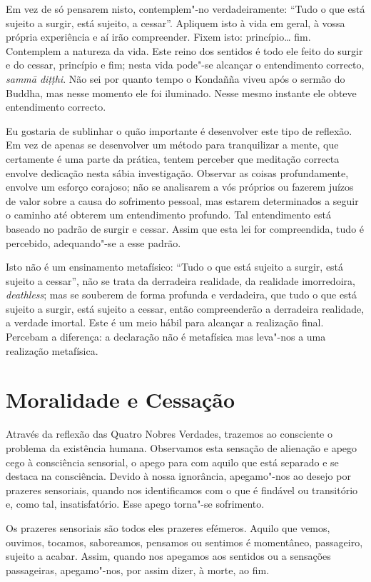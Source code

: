 Em vez de só pensarem nisto, contemplem"-no verdadeiramente: “Tudo o que está
sujeito a surgir, está sujeito, a cessar”. Apliquem isto à vida em geral, à
vossa própria experiência e aí irão compreender. Fixem isto: princípio\ldots{}
fim. Contemplem a natureza da vida. Este reino dos sentidos é todo ele feito do
surgir e do cessar, princípio e fim; nesta vida pode"-se alcançar o entendimento
correcto, \emph{sammā diṭṭhi}. Não sei por quanto tempo o Kondañña viveu após o
sermão do Buddha, mas nesse momento ele foi iluminado. Nesse mesmo instante ele
obteve entendimento correcto.

Eu gostaria de sublinhar o quão importante é desenvolver este tipo de reflexão.
Em vez de apenas se desenvolver um método para tranquilizar a mente, que
certamente é uma parte da prática, tentem perceber que meditação correcta
envolve dedicação nesta sábia investigação. Observar as coisas profundamente,
envolve um esforço corajoso; não se analisarem a vós próprios ou fazerem juízos
de valor sobre a causa do sofrimento pessoal, mas estarem determinados a seguir
o caminho até obterem um entendimento profundo. Tal entendimento está baseado no
padrão de surgir e cessar. Assim que esta lei for compreendida, tudo é
percebido, adequando"-se a esse padrão.

Isto não é um ensinamento metafísico: “Tudo o que está sujeito a surgir, está
sujeito a cessar”, não se trata da derradeira realidade, da realidade imorredoira,
\emph{deathless}; mas se souberem de forma profunda e verdadeira, que tudo o que
está sujeito a surgir, está sujeito a cessar, então compreenderão a derradeira
realidade, a verdade imortal. Este é um meio hábil para alcançar a realização
final. Percebam a diferença: a declaração não é metafísica mas leva"-nos a uma
realização metafísica.

\section{Moralidade e Cessação}

Através da reflexão das Quatro Nobres Verdades, trazemos ao consciente o
problema da existência humana. Observamos esta sensação de alienação e apego
cego à consciência sensorial, o apego para com aquilo que está separado e se
destaca na consciência. Devido à nossa ignorância, apegamo"-nos ao desejo por
prazeres sensoriais, quando nos identificamos com o que é findável ou
transitório e, como tal, insatisfatório. Esse apego torna"-se sofrimento.

Os prazeres sensoriais são todos eles prazeres efémeros. Aquilo que vemos,
ouvimos, tocamos, saboreamos, pensamos ou sentimos é momentâneo, passageiro,
sujeito a acabar. Assim, quando nos apegamos aos sentidos ou a sensações
passageiras, apegamo"-nos, por assim dizer, à morte, ao fim.

